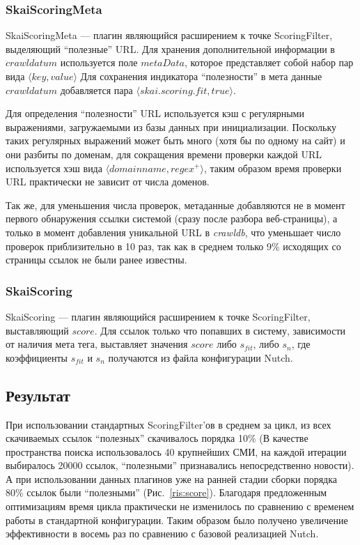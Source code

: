 \subsubsection*{SkaiScoringMeta}
\label{sec:scoringmeta}
SkaiScoringMeta --- плагин являющийся расширением к точке ScoringFilter, выделяющий ``полезные'' URL. Для хранения дополнительной информации в $crawldatum$ используется поле $metaData$, которое представляет собой набор пар вида $\langle key, value\rangle$
Для сохранения индикатора ``полезности'' в мета данные $crawldatum$ добавляется пара $\langle skai.scoring.fit, true\rangle$.

Для определения ``полезности'' URL используется кэш с регулярными выражениями, загружаемыми из базы данных при инициализации. Поскольку таких регулярных выражений может быть много (хотя бы по одному на сайт) и они разбиты по доменам, для сокращения времени проверки каждой URL используется хэш вида $\langle domainname, regex^{+}\rangle$, таким образом время проверки URL практически не зависит от числа доменов.

Так же, для уменьшения числа проверок, метаданные добавляются не в момент первого обнаружения ссылки системой (сразу после разбора веб-страницы), а только в момент добавления уникальной URL в \textit{crawldb}, что уменьшает число проверок приблизительно в 10 раз, так как в среднем только 9\% исходящих со страницы ссылок не были ранее известны.
\subsubsection*{SkaiScoring}
SkaiScoring --- плагин являющийся расширением к точке ScoringFilter, выставляющий $score$. Для ссылок только что попавших в систему, зависимости от наличия мета тега, выставляет значения $score$ либо $s_{fit}$, либо $s_{n}$, где коэффициенты $s_{fit}$ и $s_{n}$ получаются из файла конфигурации Nutch.
\subsection{Результат}
При использовании стандартных ScoringFilter'ов в среднем за цикл, из всех скачиваемых ссылок ``полезных'' скачивалось порядка 10\% (В качестве пространства поиска использовалось 40 крупнейших СМИ, на каждой итерации выбиралось 20000 ссылок, ``полезными'' признавались непосредственно новости). А при использовании данных плагинов уже на ранней стадии сборки порядка 80\% ссылок были ``полезными'' (Рис.~\ref{ris:score}). Благодаря предложенным оптимизациям время цикла практически не изменилось по сравнению с временем работы в стандартной конфигурации. Таким образом было получено увеличение эффективности в восемь раз по сравнению с базовой реализацией Nutch.

